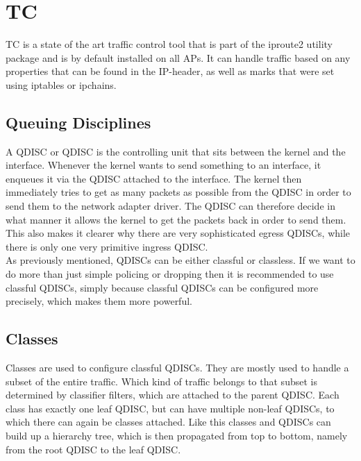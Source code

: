 \section{TC} \label{TC}
\acs{TC} is a state of the art traffic control tool that is part of the iproute2 utility package and is by default installed on all \aclp{AP}. It can handle traffic based on any properties that can be found in the \acs{IP}-header, as well as marks that were set using iptables or ipchains.

\subsection{Queuing Disciplines}

A \acs{QDISC} or \acl{QDISC} is the controlling unit that sits between the kernel and the interface. Whenever the kernel wants to send something to an interface, it enqueues it via the \acs{QDISC} attached to the interface. The kernel then immediately tries to get as many packets as possible from the \acs{QDISC} in order to send them to the network adapter driver. The \acs{QDISC} can therefore decide in what manner it allows the kernel to get the packets back in order to send them. This also makes it clearer why there are very sophisticated egress \acsp{QDISC}, while there is only one very primitive ingress \acs{QDISC}.
\\
As previously mentioned, \acsp{QDISC} can be either classful or classless. If we want to do more than just simple policing or dropping then it is recommended to use classful \acsp{QDISC}, simply because classful \acsp{QDISC} can be configured more precisely, which makes them more powerful.

\subsection{Classes}

Classes are used to configure classful \acsp{QDISC}. They are mostly used to handle a subset of the entire traffic. Which kind of traffic belongs to that subset is determined by classifier filters, which are attached to the parent \acs{QDISC}. Each class has exactly one leaf \acs{QDISC}, but can have multiple non-leaf \acsp{QDISC}, to which there can again be classes attached. Like this classes and \acsp{QDISC} can build up a hierarchy tree, which is then propagated from top to bottom, namely from the root \acs{QDISC} to the leaf \acs{QDISC}.

